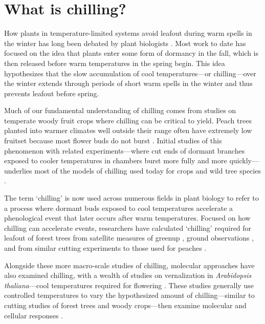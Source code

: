 \documentclass[11pt]{article}
\begin{document}
\section*{What is chilling?}

How plants in temperature-limited systems avoid leafout during warm spells in the winter has long been debated by plant biologists \citep[e.g.,][]{lamb1948effect,weinberger}. Most work to date has focused on the idea that plants enter some form of dormancy in the fall, which is then released before warm temperatures in the spring begin. This idea hypothesizes that the slow accumulation of cool temperatures---or chilling---over the winter extends through periods of short warm spells in the winter and thus prevents leafout before spring. 

Much of our fundamental understanding of chilling comes from studies on temperate woody fruit crops where chilling can be critical to yield. Peach trees planted into warmer climates well outside their range often have extremely low fruitset because most flower buds do not burst \citep{weinberger,overcash1955effects,erez1971improved}. Initial studies of this phenomenon with related experiments---where cut ends of dormant branches exposed to cooler temperatures in chambers burst more fully and more quickly---underlies most of the models of chilling used today for crops and wild tree species \citep[][]{weinberger,ospreebbms}. %

The term `chilling' is now used across numerous fields in plant biology to refer to a process where dormant buds exposed to cool temperatures accelerate a phenological event that later occurs after warm temperatures. Focused on how chilling can accelerate events, researchers have calculated `chilling' required for leafout of forest trees from satellite measures of greenup \citep{kaduk2011predicting}, ground observations \citep{Luedeling2009}, and from similar cutting experiments to those used for peaches \citep[reviewed in][]{ospreebbms}.  %

Alongside these more macro-scale studies of chilling, molecular approaches have also examined chilling, with a wealth of studies on vernalization in \emph{Arabidopsis thaliana}---cool temperatures required for flowering \citep{kim2009vernalization}. These studies generally use controlled temperatures to vary the hypothesized amount of chilling---similar to cutting studies of forest trees and woody crops---then examine molecular and cellular responses \citep[e.g.,][]{pan2021aba,azeez2021early,cai2024molecular}. %
\end{document}
